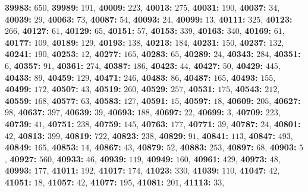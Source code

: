 \textsf{\bfseries 39983:} $650$, \textsf{\bfseries 39989:} $191$, \textsf{\bfseries 40009:} $223$, \textsf{\bfseries 40013:} $275$, \textsf{\bfseries 40031:} $190$, \textsf{\bfseries 40037:} $34$, \textsf{\bfseries 40039:} $29$, \textsf{\bfseries 40063:} $73$, \textsf{\bfseries 40087:} $54$, \textsf{\bfseries 40093:} $24$, \textsf{\bfseries 40099:} $13$, \textsf{\bfseries 40111:} $325$, \textsf{\bfseries 40123:} $266$, \textsf{\bfseries 40127:} $61$, \textsf{\bfseries 40129:} $65$, \textsf{\bfseries 40151:} $57$, \textsf{\bfseries 40153:} $339$, \textsf{\bfseries 40163:} $340$, \textsf{\bfseries 40169:} $61$, \textsf{\bfseries 40177:} $109$, \textsf{\bfseries 40189:} $129$, \textsf{\bfseries 40193:} $138$, \textsf{\bfseries 40213:} $184$, \textsf{\bfseries 40231:} $150$, \textsf{\bfseries 40237:} $132$, \textsf{\bfseries 40241:} $190$, \textsf{\bfseries 40253:} $12$, \textsf{\bfseries 40277:} $165$, \textsf{\bfseries 40283:} $65$, \textsf{\bfseries 40289:} $24$, \textsf{\bfseries 40343:} $284$, \textsf{\bfseries 40351:} $6$, \textsf{\bfseries 40357:} $91$, \textsf{\bfseries 40361:} $274$, \textsf{\bfseries 40387:} $186$, \textsf{\bfseries 40423:} $44$, \textsf{\bfseries 40427:} $50$, \textsf{\bfseries 40429:} $445$, \textsf{\bfseries 40433:} $89$, \textsf{\bfseries 40459:} $129$, \textsf{\bfseries 40471:} $246$, \textsf{\bfseries 40483:} $86$, \textsf{\bfseries 40487:} $165$, \textsf{\bfseries 40493:} $155$, \textsf{\bfseries 40499:} $172$, \textsf{\bfseries 40507:} $43$, \textsf{\bfseries 40519:} $260$, \textsf{\bfseries 40529:} $257$, \textsf{\bfseries 40531:} $175$, \textsf{\bfseries 40543:} $212$, \textsf{\bfseries 40559:} $168$, \textsf{\bfseries 40577:} $63$, \textsf{\bfseries 40583:} $127$, \textsf{\bfseries 40591:} $15$, \textsf{\bfseries 40597:} $18$, \textsf{\bfseries 40609:} $205$, \textsf{\bfseries 40627:} $98$, \textsf{\bfseries 40637:} $397$, \textsf{\bfseries 40639:} $39$, \textsf{\bfseries 40693:} $188$, \textsf{\bfseries 40697:} $22$, \textsf{\bfseries 40699:} $3$, \textsf{\bfseries 40709:} $223$, \textsf{\bfseries 40739:} $41$, \textsf{\bfseries 40751:} $238$, \textsf{\bfseries 40759:} $145$, \textsf{\bfseries 40763:} $177$, \textsf{\bfseries 40771:} $39$, \textsf{\bfseries 40787:} $24$, \textsf{\bfseries 40801:} $42$, \textsf{\bfseries 40813:} $399$, \textsf{\bfseries 40819:} $722$, \textsf{\bfseries 40823:} $238$, \textsf{\bfseries 40829:} $91$, \textsf{\bfseries 40841:} $113$, \textsf{\bfseries 40847:} $493$, \textsf{\bfseries 40849:} $165$, \textsf{\bfseries 40853:} $14$, \textsf{\bfseries 40867:} $43$, \textsf{\bfseries 40879:} $52$, \textsf{\bfseries 40883:} $253$, \textsf{\bfseries 40897:} $68$, \textsf{\bfseries 40903:} $5$, \textsf{\bfseries 40927:} $560$, \textsf{\bfseries 40933:} $46$, \textsf{\bfseries 40939:} $119$, \textsf{\bfseries 40949:} $160$, \textsf{\bfseries 40961:} $429$, \textsf{\bfseries 40973:} $48$, \textsf{\bfseries 40993:} $177$, \textsf{\bfseries 41011:} $192$, \textsf{\bfseries 41017:} $174$, \textsf{\bfseries 41023:} $330$, \textsf{\bfseries 41039:} $110$, \textsf{\bfseries 41047:} $42$, \textsf{\bfseries 41051:} $18$, \textsf{\bfseries 41057:} $42$, \textsf{\bfseries 41077:} $195$, \textsf{\bfseries 41081:} $201$, \textsf{\bfseries 41113:} $33$, 
